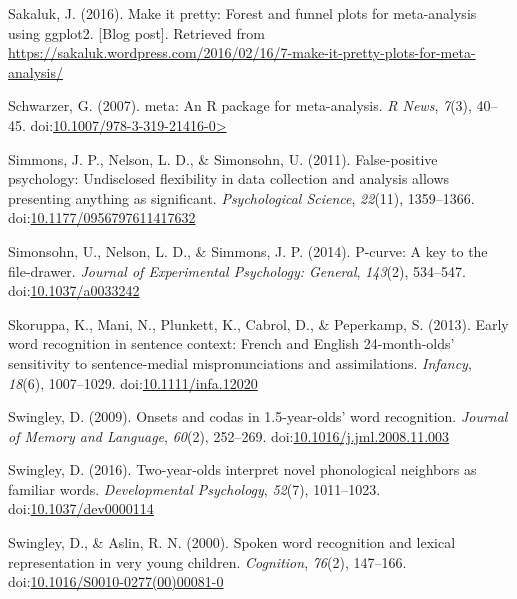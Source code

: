 \documentclass[
  man, noextraspace]{apa6}
\begin{document}
\leavevmode\hypertarget{ref-Sakaluk2016}{}%
Sakaluk, J. (2016). Make it pretty: Forest and funnel plots for meta-analysis using ggplot2. {[}Blog post{]}. Retrieved from \url{https://sakaluk.wordpress.com/2016/02/16/7-make-it-pretty-plots-for-meta-analysis/}

\leavevmode\hypertarget{ref-meta}{}%
Schwarzer, G. (2007). meta: An R package for meta-analysis. \emph{R News}, \emph{7}(3), 40--45. doi:\href{https://doi.org/10.1007/978-3-319-21416-0\%3E}{10.1007/978-3-319-21416-0\textgreater{}}

\leavevmode\hypertarget{ref-Simmons2011}{}%
Simmons, J. P., Nelson, L. D., \& Simonsohn, U. (2011). False-positive psychology: Undisclosed flexibility in data collection and analysis allows presenting anything as significant. \emph{Psychological Science}, \emph{22}(11), 1359--1366. doi:\href{https://doi.org/10.1177/0956797611417632}{10.1177/0956797611417632}

\leavevmode\hypertarget{ref-pcurve}{}%
Simonsohn, U., Nelson, L. D., \& Simmons, J. P. (2014). P-curve: A key to the file-drawer. \emph{Journal of Experimental Psychology: General}, \emph{143}(2), 534--547. doi:\href{https://doi.org/10.1037/a0033242}{10.1037/a0033242}

\leavevmode\hypertarget{ref-Skoruppa2013}{}%
Skoruppa, K., Mani, N., Plunkett, K., Cabrol, D., \& Peperkamp, S. (2013). Early word recognition in sentence context: French and English 24-month-olds' sensitivity to sentence-medial mispronunciations and assimilations. \emph{Infancy}, \emph{18}(6), 1007--1029. doi:\href{https://doi.org/10.1111/infa.12020}{10.1111/infa.12020}

\leavevmode\hypertarget{ref-Swingley2009}{}%
Swingley, D. (2009). Onsets and codas in 1.5-year-olds' word recognition. \emph{Journal of Memory and Language}, \emph{60}(2), 252--269. doi:\href{https://doi.org/10.1016/j.jml.2008.11.003}{10.1016/j.jml.2008.11.003}

\leavevmode\hypertarget{ref-Swingley2016}{}%
Swingley, D. (2016). Two-year-olds interpret novel phonological neighbors as familiar words. \emph{Developmental Psychology}, \emph{52}(7), 1011--1023. doi:\href{https://doi.org/10.1037/dev0000114}{10.1037/dev0000114}

\leavevmode\hypertarget{ref-Swingley2000}{}%
Swingley, D., \& Aslin, R. N. (2000). Spoken word recognition and lexical representation in very young children. \emph{Cognition}, \emph{76}(2), 147--166. doi:\href{https://doi.org/10.1016/S0010-0277(00)00081-0}{10.1016/S0010-0277(00)00081-0}
\end{document}

